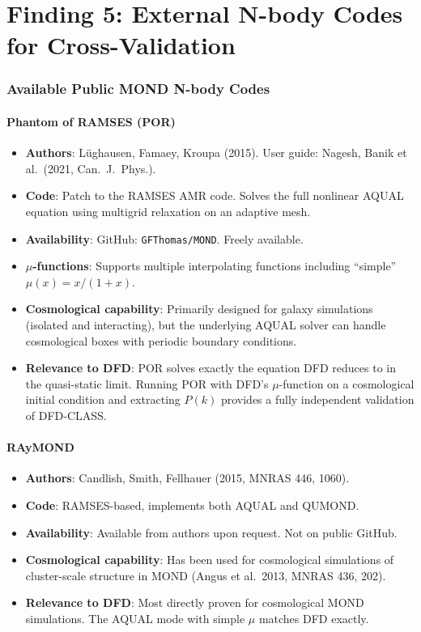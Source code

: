 \documentclass[11pt]{article}
\theoremstyle{definition}
\theoremstyle{remark}
\begin{document}
\part{Finding 5: External N-body Codes for Cross-Validation}
\label{part:nbody}

\section{Available Public MOND N-body Codes}

\subsection{Phantom of RAMSES (POR)}

\begin{itemize}
\item \textbf{Authors}: L\"ughausen, Famaey, Kroupa (2015).
  User guide: Nagesh, Banik et al.\ (2021, Can.\ J.\ Phys.).
\item \textbf{Code}: Patch to the RAMSES AMR code. Solves the full
  nonlinear AQUAL equation using multigrid relaxation on an adaptive
  mesh.
\item \textbf{Availability}: GitHub: \texttt{GFThomas/MOND}.
  Freely available.
\item \textbf{$\mu$-functions}: Supports multiple interpolating functions
  including ``simple'' $\mu(x) = x/(1+x)$.
\item \textbf{Cosmological capability}: Primarily designed for galaxy
  simulations (isolated and interacting), but the underlying AQUAL solver
  can handle cosmological boxes with periodic boundary conditions.
\item \textbf{Relevance to DFD}: POR solves exactly the equation DFD reduces
  to in the quasi-static limit. Running POR with DFD's $\mu$-function on
  a cosmological initial condition and extracting $P(k)$ provides a
  fully independent validation of DFD-CLASS.
\end{itemize}

\subsection{RAyMOND}

\begin{itemize}
\item \textbf{Authors}: Candlish, Smith, Fellhauer (2015, MNRAS 446, 1060).
\item \textbf{Code}: RAMSES-based, implements both AQUAL and QUMOND.
\item \textbf{Availability}: Available from authors upon request.
  Not on public GitHub.
\item \textbf{Cosmological capability}: Has been used for cosmological
  simulations of cluster-scale structure in MOND (Angus et al.\ 2013,
  MNRAS 436, 202).
\item \textbf{Relevance to DFD}: Most directly proven for cosmological
  MOND simulations. The AQUAL mode with simple $\mu$ matches DFD exactly.
\end{itemize}
\end{document}
